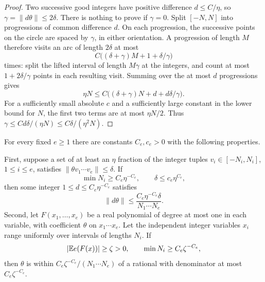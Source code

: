 \begin{proof}
Two successive good integers have positive difference
$d\le C/\eta$, so $\gamma=\|d\theta\|\le2\delta$.
There is nothing to prove if $\gamma=0$.  Split $[-N,N]$ into
progressions of common difference $d$.  On each progression, the
successive points on the circle are spaced by $\gamma$, in either
orientation.  A progression of length $M$ therefore visits an arc of
length $2\delta$ at most
\[
       C\bigl((\delta+\gamma)M+1+\delta/\gamma\bigr)
\]
times: split the lifted interval of length $M\gamma$ at the integers,
and count at most $1+2\delta/\gamma$ points in each resulting visit.
Summing over the at most $d$ progressions gives
\[
 \eta N\le C\bigl((\delta+\gamma)N+d+d\delta/\gamma\bigr).
\]
For a sufficiently small absolute $c$ and a sufficiently large
constant in the lower bound for $N$, the first two terms are at most
$\eta N/2$.  Thus
$\gamma\le Cd\delta/(\eta N)\le C\delta/(\eta^2N)$.
\end{proof}

\begin{lemma}
\label{cube:multilinear-bias}
For every fixed $e\ge1$ there are constants $C_e,c_e>0$ with the
following properties.

First, suppose a set of at least an $\eta$ fraction of the integer
tuples $v_i\in[-N_i,N_i]$, $1\le i\le e$, satisfies
$\|\theta v_1\cdots v_e\|\le\delta$.  If
\[
 \min N_i\ge C_e\eta^{-C_e},\qquad
                  \delta\le c_e\eta^{C_e},
\]
then some integer $1\le d\le C_e\eta^{-C_e}$ satisfies
\[
             \|d\theta\|\le
                   \frac{C_e\eta^{-C_e}\delta}{N_1\cdots N_e}.
\]
Second, let $F(x_1,\ldots,x_e)$ be a real polynomial of degree at
most one in each variable, with coefficient $\theta$ on
$x_1\cdots x_e$.  Let the independent integer variables $x_i$
range uniformly over intervals of lengths $N_i$.  If
\[
 |\mathbb E e(F(x))|\ge\zeta>0,
 \qquad\min N_i\ge C_e\zeta^{-C_e},
\]
then $\theta$ is within
$C_e\zeta^{-C_e}/(N_1\cdots N_e)$ of a rational with denominator
at most $C_e\zeta^{-C_e}$.
\end{lemma}

